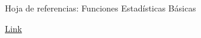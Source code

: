 \begin{frame}{Hoja de referencias: Funciones Estadísticas Básicas}

\href{file:///Users/moka/Dropbox/0.POST-PHD/GOALS/2.CODE/R/Ecomienza/15FuncionesEstadisticasBasicas/15FuncionesEstadisticasBasicas_cheatsheet.html}{\color{blue} Link}

\end{frame}